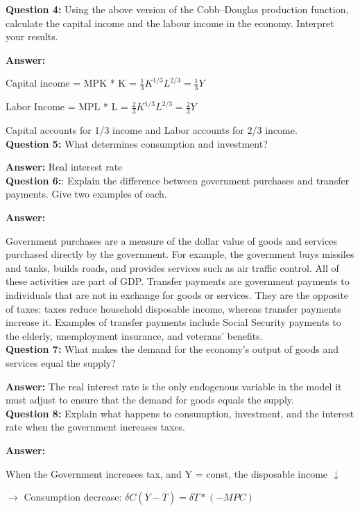\documentclass[a4paper, 11pt]{article}
\begin{document}
\textbf{Question 4:} Using the above version of the Cobb–Douglas production function, calculate the capital income and the labour income in the economy. Interpret your results.

\textbf{Answer:}

Capital income = MPK * K = $\frac{1}{3}K^{1/3}L^{2/3} = \frac{1}{3}Y$

Labor Income = MPL * L = $\frac{2}{3}K^{1/3}L^{2/3} = \frac{2}{3}Y$

Capital accounts for 1/3 income and Labor accounts for 2/3 income. \\


\textbf{Question 5:} What determines consumption and investment?

\textbf{Answer:}
Real interest rate \\

\textbf{Question 6:}: Explain the difference between government purchases and transfer payments. Give two examples of each.

\textbf{Answer:} 

Government purchases are a measure of the dollar value of goods and services purchased directly by the government. For example, the government buys missiles and tanks, builds roads, and provides services such as air traffic control. All of these activities are part of GDP. Transfer payments are government payments to individuals that are not in exchange for goods or services. They are the opposite of taxes: taxes reduce household disposable income, whereas transfer payments increase it. Examples of transfer payments include Social Security payments to the elderly, unemployment insurance, and veterans' benefits.
\\

\textbf{Question 7:} What makes the demand for the economy’s output of goods and services equal the supply?

\textbf{Answer:} 
The real interest rate is the only endogenous variable in the model it must adjust to ensure that the demand for goods equals the supply. \\

\textbf{Question 8:} Explain what happens to consumption, investment, and the interest rate when the government increases taxes.

\textbf{Answer:} 

When the Government increases tax, and Y = const, the disposable income $\downarrow$

$\rightarrow$ Consumption decrease: $\delta C(\overline{Y} - \overline{T}) = \delta T * (-MPC)$
\end{document}

